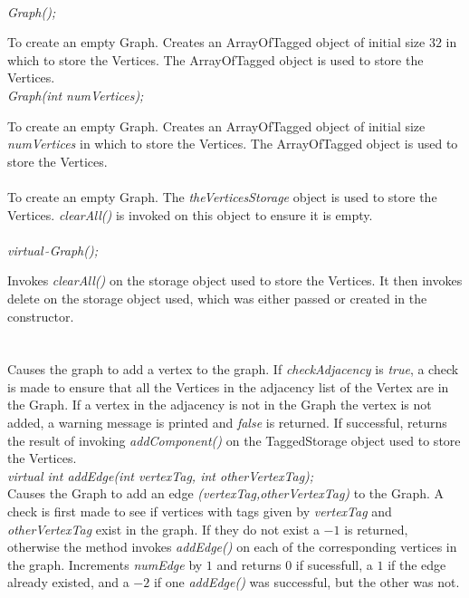  \\
{\em Graph();}  

To create an empty Graph. Creates an ArrayOfTagged object of initial
size $32$ in which to store the Vertices. The ArrayOfTagged object is
used to store the Vertices.\\

{\em Graph(int numVertices);} 

To create an empty Graph. Creates an ArrayOfTagged object of initial
size {\em numVertices} in which to store the Vertices. The
ArrayOfTagged object is used to store the Vertices. \\ 

\\ 
To create an empty Graph. The {\em theVerticesStorage} object is used to
store the Vertices. {\em clearAll()} is invoked on this object to
ensure it is empty. \\

  \\
{\em virtual~$\tilde{}$Graph();}  

Invokes {\em clearAll()} on the storage object used to store the
Vertices. It then invokes delete on the storage object used, which was
either passed or created in the constructor. \\

  \\
 \\
Causes the graph to add a vertex to the graph. If {\em checkAdjacency}
is {\em true}, a check is made to ensure that all the Vertices in the
adjacency list of the Vertex are in the Graph. If a vertex in the
adjacency is not in the Graph the vertex is not added, a warning
message is printed and {\em false} is returned. If successful,
returns the result of invoking {\em addComponent()} on the
TaggedStorage object used to store the Vertices. \\



{\em virtual int addEdge(int vertexTag, int otherVertexTag); } \\
Causes the Graph to add an edge {\em (vertexTag,otherVertexTag)} to
the Graph. A check is first made to see if vertices with tags given by
{\em vertexTag} and {\em otherVertexTag} exist in the graph. If they
do not exist a $-1$ is returned, otherwise the method invokes {\em
addEdge()} on each of the corresponding vertices in the 
graph. Increments {\em numEdge} by $1$ and returns $0$ if sucessfull,
a $1$ if the edge already existed, and a $-2$ if one {\em addEdge()}
was successful, but the other was not.\\  

